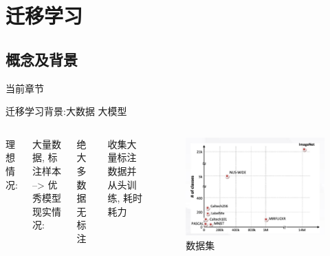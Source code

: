 \section{迁移学习}

\subsection{概念及背景}

\begin{frame}{当前章节}
\end{frame}

\begin{frame}{迁移学习背景:大数据 大模型}
    \begin{columns}
        理想情况: 
        
        大量数据, 标注样本 --> 优秀模型\\[0.5cm]

        现实情况: 
        
        绝大多数据无标注
        
        收集大量标注数据并从头训练, 耗时耗力 

        \begin{figure}
            \centering
            \includegraphics[width=\textwidth]{pic/pic01.jpg}
            \caption{数据集}
            \label{fig:01}
        \end{figure}

    \end{columns}
    
    
\end{frame}

